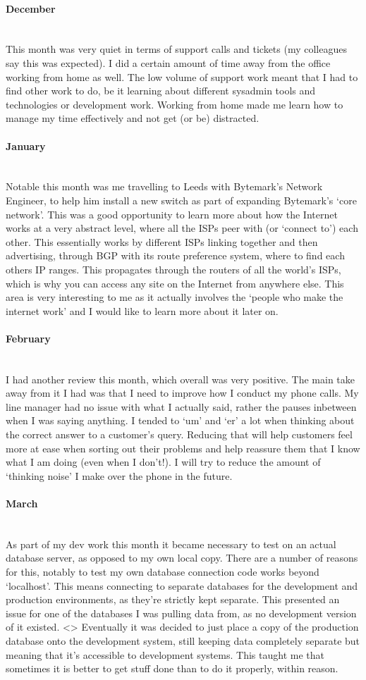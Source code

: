 \documentclass[12pt,a4paper]{article}
\newcommand{\paragraphnl}[1]{\paragraph{#1}\mbox{}\\}
\begin{document}
\paragraphnl{December}
	This month was very quiet in terms of support calls and tickets (my
	colleagues say this was expected). I did a certain amount of time away from
	the office working from home as well. The low volume of support work meant
	that I had to find other work to do, be it learning about different sysadmin
	tools and technologies or development work. Working from home made me learn
	how to manage my time effectively and not get (or be) distracted.

\paragraphnl{January}
	Notable this month was me travelling to Leeds with Bytemark's Network
	Engineer, to help him install a new switch as part of expanding Bytemark's
	`core network'. This was a good opportunity to learn more about how the
	Internet works at a very abstract level, where all the ISPs peer with (or
	`connect to') each other. This essentially works by different ISPs linking
	together and then advertising, through BGP with its route preference system,
	where to find each others IP ranges. This propagates through the routers of
	all the world's ISPs, which is why you can access any site on the Internet
	from anywhere else. This area is very interesting to me as it actually
	involves the `people who make the internet work' and I would like to learn
	more about it later on.

\paragraphnl{February}
	I had another review this month, which overall was very positive. The main
	take away from it I had was that I need to improve how I conduct my phone
	calls. My line manager had no issue with what I actually said, rather the
	pauses inbetween when I was saying anything. I tended to `um' and `er' a lot
	when thinking about the correct answer to a customer's query. Reducing that
	will help customers feel more at ease when sorting out their problems and
	help reassure them that I know what I am doing (even when I don't!). I will
	try to reduce the amount of `thinking noise' I make over the phone in the
	future.

\paragraphnl{March}
	As part of my dev work this month it became necessary to test on an actual
	database server, as opposed to my own local copy. There are a number of
	reasons for this, notably to test my own database connection code works
	beyond `localhost'. This means connecting to separate databases for the
	development and production environments, as they're strictly kept separate.
	This presented an issue for one of the databases I was pulling data from, as
	no development version of it existed. <>
	Eventually it was decided to just place a copy of the production database
	onto the development system, still keeping data completely separate but
	meaning that it's accessible to development systems. This taught me that
	sometimes it is better to get stuff done than to do it properly, within
	reason.
\end{document}
